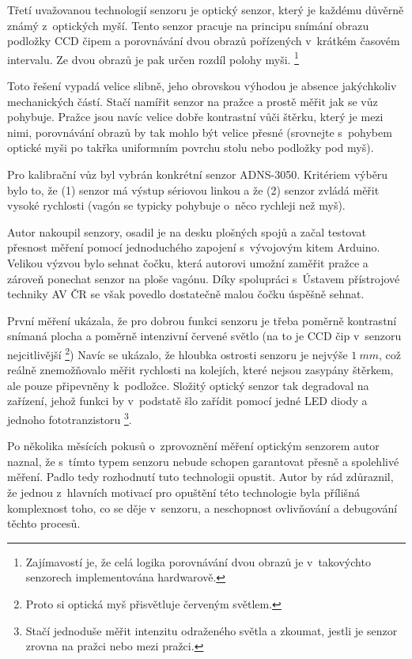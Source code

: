 Třetí uvažovanou technologií senzoru je optický senzor, který je každému
důvěrně známý z~optických myší. Tento senzor pracuje na principu snímání obrazu
podložky CCD čipem a porovnávání dvou obrazů pořízených v~krátkém časovém
intervalu. Ze dvou obrazů je pak určen rozdíl polohy myši.
\footnote{Zajímavostí je, že celá logika porovnávání dvou obrazů je
v~takovýchto senzorech implementována hardwarově.}

Toto řešení vypadá velice slibně, jeho obrovskou výhodou je absence jakýchkoliv
mechanických částí. Stačí namířit senzor na pražce a prostě měřit jak se vůz
pohybuje. Pražce jsou navíc velice dobře kontrastní vůči štěrku, který je mezi
nimi, porovnávání obrazů by tak mohlo být velice přesné (srovnejte s~pohybem
optické myši po takřka uniformním povrchu stolu nebo podložky pod myš).

Pro kalibrační vůz byl vybrán konkrétní senzor ADNS-3050. Kritériem výběru
bylo to, že (1) senzor má výstup sériovou linkou a že (2) senzor zvládá měřit
vysoké rychlosti (vagón se typicky pohybuje o~něco rychleji než myš).

Autor nakoupil senzory, osadil je na desku plošných spojů a začal testovat
přesnost měření pomocí jednoduchého zapojení s~vývojovým kitem Arduino. Velikou
výzvou bylo sehnat čočku, která autorovi umožní zaměřit pražce a zároveň
ponechat senzor na ploše vagónu. Díky spolupráci s~Ústavem přístrojové techniky
AV ČR se však povedlo dostatečně malou čočku úspěšně sehnat.

První měření ukázala, že pro dobrou funkci senzoru je třeba poměrně kontrastní
snímaná plocha a poměrně intenzivní červené světlo (na to je CCD čip v~senzoru
nejcitlivější \footnote{Proto si optická myš přisvětluje červeným světlem.})
Navíc se ukázalo, že hloubka ostrosti senzoru je nejvýše $1\ mm$, což reálně
znemožňovalo měřit rychlosti na kolejích, které nejsou zasypány štěrkem, ale
pouze připevněny k~podložce. Složitý optický senzor tak degradoval na zařízení,
jehož funkci by v~podstatě šlo zařídit pomocí jedné LED diody a jednoho
fototranzistoru \footnote{Stačí jednoduše měřit intenzitu odraženého světla a
zkoumat, jestli je senzor zrovna na pražci nebo mezi pražci.}.

Po několika měsících pokusů o~zprovoznění měření optickým senzorem autor naznal,
že s~tímto typem senzoru nebude schopen garantovat přesně a spolehlivé měření.
Padlo tedy rozhodnutí tuto technologii opustit. Autor by rád zdůraznil, že
jednou z~hlavních motivací pro opuštění této technologie byla přílišná
komplexnost toho, co se děje v~senzoru, a neschopnost ovlivňování a debugování
těchto procesů.

